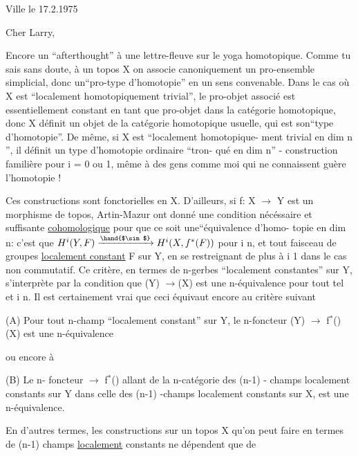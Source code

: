 

Ville le 17.2.1975

Cher Larry,

 Encore un ``afterthought'' à une lettre-fleuve  sur le yoga homotopique.
Comme tu sais sans doute, à un topos X on associe canoniquement un 
pro-ensemble simplicial, donc un``pro-type  d'homotopie'' en un sens convenable.
Dans le cas où X est ``localement homotopiquement trivial'', le pro-objet
associé est essentiellement constant en tant que pro-objet dans la catégorie
homotopique, donc X définit un objet de la catégorie homotopique usuelle,
qui est son\hand{|}``type d'homotopie''.  De même, si X est  ``localement homotopique-%
ment  trivial en dim \hand{$\leq$} n '', il définit un type d'homotopie  ordinaire ``tron-%
qué en dim \hand{$\leq$} n''  -  construction familière pour i = 0 ou 1, même à des
gens comme moi qui ne connaissent guère l'homotopie !

Ces constructions sont fonctorielles en X. D'ailleurs, si  f: X $\longrightarrow$ Y
est un morphisme de topos,  Artin-Mazur ont donné  une condition nécéssaire
et suffisante  \uline{cohomologique}   pour que ce soit  une\hand{|}``équivalence d'homo-%
topie en dim \hand{$\leq$} n: c'est que  $H^{i}(Y,F) \xrightarrow{\hand{$\sim$}} H^{i}(X,f^{*}(F))$   pour i \hand{$\leq$} n, et
tout faisceau de groupes  \uline{localement constant}  F sur Y, en se restreignant
de plus à  i\hand{$\leq$} 1  dans le cas  non commutatif. Ce critère, en termes
de n-gerbes ``localement constantes''   sur Y, s'interprète par la condition
que  (Y) $\longrightarrow$(X)   est une n-équivalence  pour tout tel  et  i\hand{$\leq$} n.
Il est certainement vrai que ceci équivaut encore au critère suivant

(A)  Pour tout n-champ  ``localement constant''   sur Y, le
n-foncteur  (Y) $\longrightarrow$ f$^{*}$()(X)  est une n-équivalence

ou encore à

(B)  Le n- foncteur $\longrightarrow$ f$^{*}$()   allant de la n-catégorie
des (n-1) - champs localement constants  sur Y dans celle des (n-1) -champs
localement  constants sur X,  est une n-équivalence.

En d'autres termes, les constructions sur un topos X  qu'on peut
faire en termes de (n-1) champs \uline{localement}  constants ne dépendent que de

